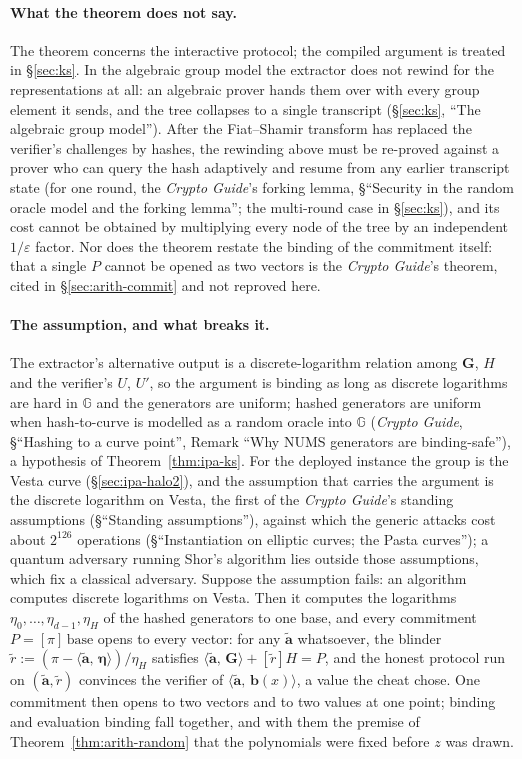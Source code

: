 \documentclass[11pt,a4paper]{article}
\theoremstyle{definition}
\newcommand{\G}{\mathbb{G}}
\newcommand{\ip}[2]{\langle #1,\, #2 \rangle}
\begin{document}
\paragraph{What the theorem does not say.}
The theorem concerns the interactive protocol; the compiled argument is
treated in \S\ref{sec:ks}. In the algebraic group model the extractor
does not rewind for the representations at all: an algebraic prover
hands them over with every group element it sends, and the tree
collapses to a single transcript (\S\ref{sec:ks}, ``The algebraic group
model''). After the Fiat--Shamir transform has replaced the verifier's
challenges by hashes, the rewinding above must be re-proved against a
prover who can query the hash adaptively and resume from any earlier
transcript state (for one round, the \emph{Crypto Guide}'s forking
lemma, \S``Security in the random oracle model and the forking lemma'';
the multi-round case in \S\ref{sec:ks}), and its cost cannot be
obtained by multiplying every node of the tree by an independent
$1/\varepsilon$ factor. Nor does the theorem restate the binding of the
commitment itself: that a single $P$ cannot be opened as two vectors is
the \emph{Crypto Guide}'s theorem, cited in \S\ref{sec:arith-commit}
and not reproved here.

\paragraph{The assumption, and what breaks it.}
The extractor's alternative output is a discrete-logarithm relation
among $\mathbf G$, $H$ and the verifier's $U$, $U'$, so the argument is
binding as long as discrete logarithms are hard in $\G$ and the
generators are uniform; hashed generators are uniform when hash-to-curve
is modelled as a random oracle into $\G$ (\emph{Crypto Guide},
\S``Hashing to a curve point'', Remark ``Why NUMS generators are
binding-safe''), a hypothesis of Theorem~\ref{thm:ipa-ks}. For the
deployed instance
the group is the Vesta curve (\S\ref{sec:ipa-halo2}), and the
assumption that carries the argument is the discrete logarithm on
Vesta, the first of the \emph{Crypto Guide}'s standing assumptions
(\S``Standing assumptions''), against which the generic attacks cost
about $2^{126}$ operations (\S``Instantiation on elliptic curves; the
Pasta curves''); a quantum adversary running Shor's algorithm lies
outside those assumptions, which fix a classical adversary. Suppose the
assumption fails: an algorithm computes discrete logarithms on Vesta.
Then it computes the logarithms $\eta_0, \dots, \eta_{d-1}, \eta_H$ of the
hashed generators to one base, and every commitment
$P = [\pi]\,\mathrm{base}$ opens to every vector: for any
$\tilde{\mathbf a}$ whatsoever, the blinder
$\tilde r := (\pi - \ip{\tilde{\mathbf a}}{\boldsymbol\eta})/\eta_H$
satisfies $\ip{\tilde{\mathbf a}}{\mathbf G} + [\tilde r]H = P$, and the
honest protocol run on $(\tilde{\mathbf a}, \tilde r)$ convinces the
verifier of $\ip{\tilde{\mathbf a}}{\mathbf b(x)}$, a value the cheat
chose. One
commitment then opens to two vectors and to two values at one point;
binding and evaluation binding fall together, and with them the premise
of Theorem~\ref{thm:arith-random} that the polynomials were fixed
before $z$ was drawn.
\end{document}
